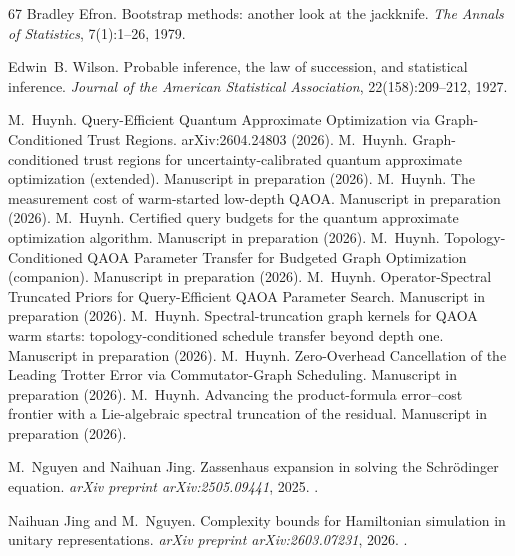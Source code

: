 \documentclass[aps,prxquantum,twocolumn,superscriptaddress,nofootinbib,longbibliography]{revtex4-2}
\begin{document}
\begin{thebibliography}{67}
Bradley Efron. Bootstrap methods: another look at the jackknife. \emph{The
Annals of Statistics}, 7(1):1--26, 1979.

Edwin~B. Wilson. Probable inference, the law of succession, and statistical
inference. \emph{Journal of the American Statistical Association},
22(158):209--212, 1927.

 M.~Huynh. Query-Efficient Quantum Approximate Optimization via Graph-Conditioned Trust Regions. arXiv:2604.24803 (2026).
 M.~Huynh. Graph-conditioned trust regions for uncertainty-calibrated quantum approximate optimization (extended). Manuscript in preparation (2026).
 M.~Huynh. The measurement cost of warm-started low-depth QAOA. Manuscript in preparation (2026).
 M.~Huynh. Certified query budgets for the quantum approximate optimization algorithm. Manuscript in preparation (2026).
 M.~Huynh. Topology-Conditioned QAOA Parameter Transfer for Budgeted Graph Optimization (companion). Manuscript in preparation (2026).
 M.~Huynh. Operator-Spectral Truncated Priors for Query-Efficient QAOA Parameter Search. Manuscript in preparation (2026).
 M.~Huynh. Spectral-truncation graph kernels for QAOA warm starts: topology-conditioned schedule transfer beyond depth one. Manuscript in preparation (2026).
 M.~Huynh. Zero-Overhead Cancellation of the Leading Trotter Error via Commutator-Graph Scheduling. Manuscript in preparation (2026).
 M.~Huynh. Advancing the product-formula error--cost frontier with a Lie-algebraic spectral truncation of the residual. Manuscript in preparation (2026).

M.~Nguyen and Naihuan Jing. Zassenhaus expansion in solving the {Schr\"odinger}
equation. \emph{arXiv preprint arXiv:2505.09441}, 2025.
\newblock {}.

Naihuan Jing and M.~Nguyen. Complexity bounds for {Hamiltonian} simulation in
unitary representations. \emph{arXiv preprint arXiv:2603.07231}, 2026.
\newblock {}.

\end{thebibliography}
\end{document}
